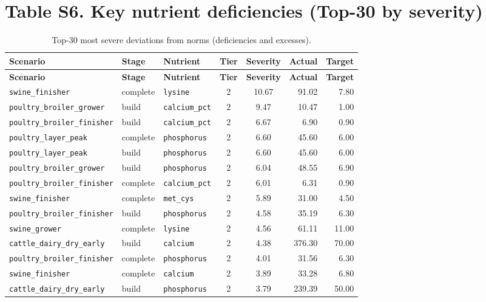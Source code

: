 \documentclass[11pt]{article}
\begin{document}
\section*{Table S6. Key nutrient deficiencies (Top-30 by severity)}
\begin{longtable}{lllccrr}
\caption{Top-30 most severe deviations from norms (deficiencies and excesses).}\label{tab:s6_issues} \\
\toprule
\textbf{Scenario} & \textbf{Stage} & \textbf{Nutrient} & \textbf{Tier} & \textbf{Severity} & \textbf{Actual} & \textbf{Target} \\
\midrule
\endfirsthead
\toprule
\textbf{Scenario} & \textbf{Stage} & \textbf{Nutrient} & \textbf{Tier} & \textbf{Severity} & \textbf{Actual} & \textbf{Target} \\
\midrule
\endhead
\bottomrule
\endfoot
\bottomrule
\endlastfoot
\texttt{swine\_finisher} & complete & \texttt{lysine} & 2 & 10.67 & 91.02 & 7.80 \\
\texttt{poultry\_broiler\_grower} & build & \texttt{calcium\_pct} & 2 & 9.47 & 10.47 & 1.00 \\
\texttt{poultry\_broiler\_finisher} & build & \texttt{calcium\_pct} & 2 & 6.67 & 6.90 & 0.90 \\
\texttt{poultry\_layer\_peak} & complete & \texttt{phosphorus} & 2 & 6.60 & 45.60 & 6.00 \\
\texttt{poultry\_layer\_peak} & build & \texttt{phosphorus} & 2 & 6.60 & 45.60 & 6.00 \\
\texttt{poultry\_broiler\_grower} & build & \texttt{phosphorus} & 2 & 6.04 & 48.55 & 6.90 \\
\texttt{poultry\_broiler\_finisher} & complete & \texttt{calcium\_pct} & 2 & 6.01 & 6.31 & 0.90 \\
\texttt{swine\_finisher} & complete & \texttt{met\_cys} & 2 & 5.89 & 31.00 & 4.50 \\
\texttt{poultry\_broiler\_finisher} & build & \texttt{phosphorus} & 2 & 4.58 & 35.19 & 6.30 \\
\texttt{swine\_grower} & complete & \texttt{lysine} & 2 & 4.56 & 61.11 & 11.00 \\
\texttt{cattle\_dairy\_dry\_early} & build & \texttt{calcium} & 2 & 4.38 & 376.30 & 70.00 \\
\texttt{poultry\_broiler\_finisher} & complete & \texttt{phosphorus} & 2 & 4.01 & 31.56 & 6.30 \\
\texttt{swine\_finisher} & complete & \texttt{calcium} & 2 & 3.89 & 33.28 & 6.80 \\
\texttt{cattle\_dairy\_dry\_early} & build & \texttt{phosphorus} & 2 & 3.79 & 239.39 & 50.00 \\

\end{longtable}
\end{document}
